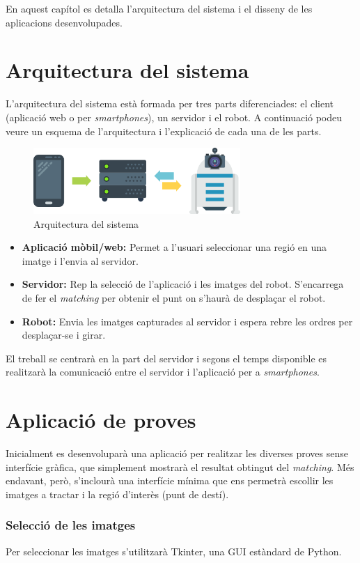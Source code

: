 En aquest capítol es detalla l'arquitectura del sistema i el disseny de les aplicacions desenvolupades.
\section{Arquitectura del sistema}
	L'arquitectura del sistema està formada per tres parts diferenciades: el client (aplicació web o per \textit{smartphones}), un servidor i el robot. A continuació podeu veure un esquema de l'arquitectura i l'explicació
	de cada una de les parts.\\
	\begin{figure}[H]
		\centering
		\includegraphics[width=0.7\textwidth]{images/arquitectura}
		\caption{Arquitectura del sistema}
	\end{figure}
	\vspace{0.05cm}
	\begin{itemize}
		\item{\textbf{Aplicació mòbil/web:} Permet a l'usuari seleccionar una regió en una imatge i l'envia al servidor.}
		\item{\textbf{Servidor:} Rep la selecció de l'aplicació i les imatges del robot. S'encarrega de fer el \textit{matching} per obtenir el punt on s'haurà de desplaçar el robot.}
		\item{\textbf{Robot:} Envia les imatges capturades al servidor i espera rebre les ordres per desplaçar-se i girar.\\}
	\end{itemize}
	El treball se centrarà en la part del servidor i segons el temps disponible es realitzarà la comunicació entre el servidor i l'aplicació per a \textit{smartphones}.

\section{Aplicació de proves}
	Inicialment es desenvoluparà una aplicació per realitzar les diverses proves sense interfície gràfica, que simplement mostrarà el resultat obtingut del \textit{matching}. Més endavant, però, s'inclourà una
	interfície mínima que ens permetrà escollir les imatges a tractar i la regió d'interès (punt de destí).
	\subsubsection{Selecció de les imatges}
		Per seleccionar les imatges s'utilitzarà Tkinter, una GUI estàndard de Python.

